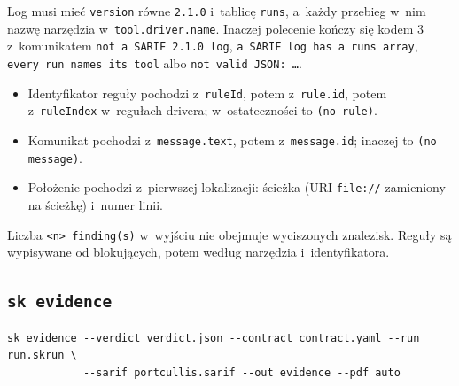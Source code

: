 Log musi mieć \texttt{version} równe \texttt{2.1.0} i~tablicę \texttt{runs}, a~każdy
przebieg w~nim nazwę narzędzia w~\texttt{tool.driver.name}. Inaczej polecenie kończy się
kodem 3 z~komunikatem \texttt{not a SARIF 2.1.0 log}, \texttt{a SARIF log has a runs
array}, \texttt{every run names its tool} albo \texttt{not valid JSON: …}.
\begin{itemize}
  \item Identyfikator reguły pochodzi z~\texttt{ruleId}, potem z~\texttt{rule.id}, potem
        z~\texttt{ruleIndex} w~regułach drivera; w~ostateczności to \texttt{(no rule)}.
  \item Komunikat pochodzi z~\texttt{message.text}, potem z~\texttt{message.id}; inaczej to
        \texttt{(no message)}.
  \item Położenie pochodzi z~pierwszej lokalizacji: ścieżka (URI \texttt{file://} zamieniony
        na ścieżkę) i~numer linii.
\end{itemize}
Liczba \texttt{<n> finding(s)} w~wyjściu nie obejmuje wyciszonych znalezisk. Reguły są
wypisywane od blokujących, potem według narzędzia i~identyfikatora.


\subsection{\texttt{sk evidence}}\label{sec:cli-evidence}

\begin{lstlisting}
sk evidence --verdict verdict.json --contract contract.yaml --run run.skrun \
            --sarif portcullis.sarif --out evidence --pdf auto
\end{lstlisting}

